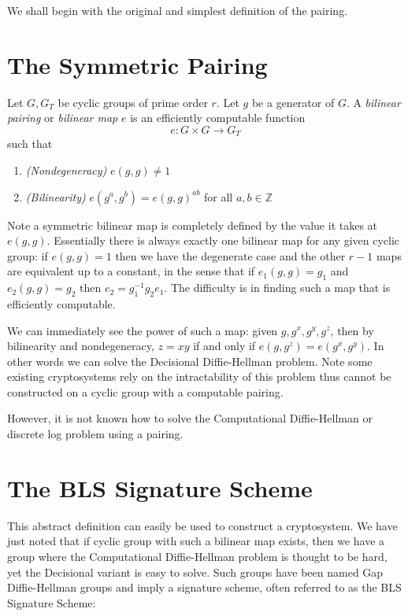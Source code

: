 We shall begin with the original and simplest definition of the pairing.

\section{The Symmetric Pairing}

Let $G, G_T$ be cyclic groups of prime order $r$.
Let $g$ be a generator of $G$.
A \emph{bilinear pairing} or \emph{bilinear map}
$e$ is an efficiently computable function
\[
e:G \times G \rightarrow G_T
\]
such that
\begin{enumerate}
\item
\emph{(Nondegeneracy)}
$e(g,g) \ne 1$
\item
\emph{(Bilinearity)}
$e(g^a, g^b) = e(g,g)^{a b}$ for all $a, b \in \mathbb{Z}$
\end{enumerate}

Note a symmetric bilinear map is completely defined by the value it
takes at $e(g,g)$. Essentially there is always exactly one bilinear map
for any given cyclic group: if
$e(g,g)=1$ then we have the degenerate case and the other $r-1$ maps are
equivalent up to a constant,
in the sense that if $e_1(g,g) = g_1$ and $e_2(g,g) = g_2$
then $e_2 = g_1^{-1} g_2 e_1$. The difficulty is in finding such a map
that is efficiently computable.

We can immediately see the power of such a map: given
$g, g^x, g^y, g^z$, then by bilinearity and nondegeneracy,
$z = x y$ if and only if
$e(g, g^z) = e(g^x, g^y)$. In other words we can solve the Decisional
Diffie-Hellman problem.
Note some existing cryptosystems rely on the intractability of this
problem thus cannot be constructed on a cyclic group with
a computable pairing.

However, it is not known how to solve the Computational Diffie-Hellman
or discrete log problem using a pairing.

\section{The BLS Signature Scheme}

This abstract definition can easily be used to construct
a cryptosystem. We have just noted that if cyclic group with such a
bilinear map exists, then we have a group where the Computational
Diffie-Hellman
problem is thought to be hard, yet the Decisional variant is easy to solve.
Such groups have been named Gap Diffie-Hellman groups\cite{bls} and
imply a signature scheme, often referred to as the BLS Signature Scheme:

